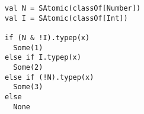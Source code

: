 \begin{lstlisting}[style=scalaioScala]
val N = SAtomic(classOf[Number])
val I = SAtomic(classOf[Int])

if (N & !I).typep(x)
  Some(1)
else if I.typep(x)
  Some(2)
else if (!N).typep(x)
  Some(3)
else
  None
\end{lstlisting}

